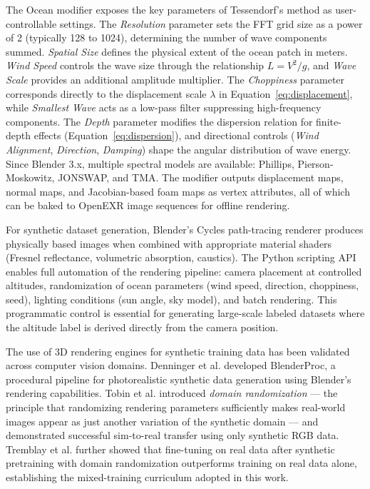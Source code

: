     The Ocean modifier exposes the key parameters of Tessendorf's method as user-controllable settings. The \emph{Resolution} parameter sets the FFT grid size as a power of 2 (typically 128 to 1024), determining the number of wave components summed. \emph{Spatial Size} defines the physical extent of the ocean patch in meters. \emph{Wind Speed} controls the wave size through the relationship $L = V^2/g$, and \emph{Wave Scale} provides an additional amplitude multiplier. The \emph{Choppiness} parameter corresponds directly to the displacement scale $\lambda$ in Equation~\ref{eq:displacement}, while \emph{Smallest Wave} acts as a low-pass filter suppressing high-frequency components. The \emph{Depth} parameter modifies the dispersion relation for finite-depth effects (Equation~\ref{eq:dispersion}), and directional controls (\emph{Wind Alignment}, \emph{Direction}, \emph{Damping}) shape the angular distribution of wave energy. Since Blender 3.x, multiple spectral models are available: Phillips, Pierson-Moskowitz, JONSWAP, and TMA. The modifier outputs displacement maps, normal maps, and Jacobian-based foam maps as vertex attributes, all of which can be baked to OpenEXR image sequences for offline rendering.

    For synthetic dataset generation, Blender's Cycles path-tracing renderer produces physically based images when combined with appropriate material shaders (Fresnel reflectance, volumetric absorption, caustics). The Python scripting API enables full automation of the rendering pipeline: camera placement at controlled altitudes, randomization of ocean parameters (wind speed, direction, choppiness, seed), lighting conditions (sun angle, sky model), and batch rendering. This programmatic control is essential for generating large-scale labeled datasets where the altitude label is derived directly from the camera position.

    The use of 3D rendering engines for synthetic training data has been validated across computer vision domains. Denninger et al. \cite{BlenderProc2023} developed BlenderProc, a procedural pipeline for photorealistic synthetic data generation using Blender's rendering capabilities. Tobin et al. \cite{Tobin2017} introduced \emph{domain randomization} --- the principle that randomizing rendering parameters sufficiently makes real-world images appear as just another variation of the synthetic domain --- and demonstrated successful sim-to-real transfer using only synthetic RGB data. Tremblay et al. \cite{Tremblay2018} further showed that fine-tuning on real data after synthetic pretraining with domain randomization outperforms training on real data alone, establishing the mixed-training curriculum adopted in this work.

